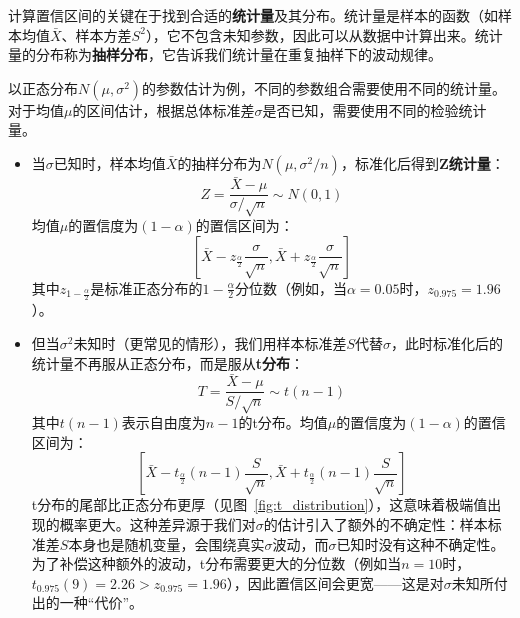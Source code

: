 
计算置信区间的关键在于找到合适的\textbf{统计量}及其分布。统计量是样本的函数（如样本均值$\bar{X}$、样本方差$S^2$），它不包含未知参数，因此可以从数据中计算出来。统计量的分布称为\textbf{抽样分布}，它告诉我们统计量在重复抽样下的波动规律。

以正态分布$N(\mu, \sigma^2)$的参数估计为例，不同的参数组合需要使用不同的统计量。
对于均值$\mu$的区间估计，根据总体标准差$\sigma$是否已知，需要使用不同的检验统计量。
\begin{itemize}
\item 当$\sigma$已知时，样本均值$\bar{X}$的抽样分布为$N(\mu, \sigma^2/n)$，标准化后得到\textbf{Z统计量}：
\begin{equation*}
Z = \frac{\bar{X} - \mu}{\sigma/\sqrt{n}} \sim N(0, 1)
\end{equation*}
均值$\mu$的置信度为$(1-\alpha)$的置信区间为：
\begin{equation*}
\left[\bar{X} - z_{\frac{\alpha}{2}}\frac{\sigma}{\sqrt{n}}, \bar{X} + z_{\frac{\alpha}{2}}\frac{\sigma}{\sqrt{n}}\right]
\end{equation*}
其中$z_{1-\frac{\alpha}{2}}$是标准正态分布的$1-\frac{\alpha}{2}$分位数（例如，当$\alpha=0.05$时，$z_{0.975}=1.96$）。

\item 但当$\sigma^2$未知时（更常见的情形），我们用样本标准差$S$代替$\sigma$，此时标准化后的统计量不再服从正态分布，而是服从\textbf{t分布}：
\begin{equation*}
T = \frac{\bar{X} - \mu}{S/\sqrt{n}} \sim t(n-1)
\end{equation*}
其中$t(n-1)$表示自由度为$n-1$的t分布。均值$\mu$的置信度为$(1-\alpha)$的置信区间为：
\begin{equation*}
\left[\bar{X} - t_{\frac{\alpha}{2}}(n-1)\frac{S}{\sqrt{n}}, \bar{X} + t_{\frac{\alpha}{2}}(n-1)\frac{S}{\sqrt{n}}\right]
\end{equation*}
t分布的尾部比正态分布更厚（见图~\ref{fig:t_distribution}），这意味着极端值出现的概率更大。这种差异源于我们对$\sigma$的估计引入了额外的不确定性：样本标准差$S$本身也是随机变量，会围绕真实$\sigma$波动，而$\sigma$已知时没有这种不确定性。为了补偿这种额外的波动，t分布需要更大的分位数（例如当$n=10$时，$t_{0.975}(9)=2.26 > z_{0.975}=1.96$），因此置信区间会更宽——这是对$\sigma$未知所付出的一种``代价''。
\end{itemize}

